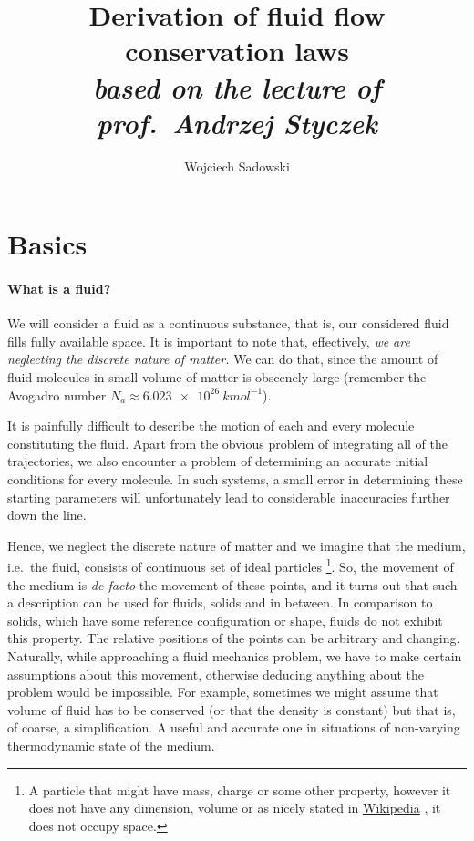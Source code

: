 \documentclass[a4paper]{article}
\title{Derivation of fluid flow conservation laws\\
\large \textit{based on the lecture of prof.\ Andrzej Styczek}}
\author{Wojciech Sadowski}
\newcommand{\wikilink}[2][Wikipedia]{%
  \href{https://en.wikipedia.org/wiki/#2}{#1}%
}
\begin{document}
\maketitle

\section{Basics}

\paragraph{What is a fluid?}
We will consider a fluid as a continuous substance, that is, our considered
fluid fills fully available space. It is important to note that, effectively,
\emph{we are neglecting the discrete nature of matter.} We can do that, since
the amount of fluid molecules in small volume of matter is obscenely large
(remember the Avogadro number \(N_a\approx\SI{6.023e26}{kmol^{-1}}\)).

It is painfully difficult to describe the motion of each and every molecule
constituting the fluid. Apart from the obvious problem of integrating all of
the trajectories, we also encounter a problem of determining an accurate
initial conditions for every molecule. In such systems, a small error in
determining these starting parameters will unfortunately lead to considerable
inaccuracies further down the line.

Hence, we neglect the discrete nature of matter and we imagine that the medium,
i.e.\ the fluid, consists of continuous set of ideal particles%
\footnote{%
	A particle that might have mass, charge or some other property, however it does
	not have any dimension, volume or as nicely stated in
	\wikilink{Point\_particle}, it does not occupy space.
}.
So, the movement of the medium is \emph{de facto} the movement of these points,
and it turns out that such a description can be used for fluids, solids and
 in between. In comparison to solids, which have some 
reference configuration or shape, fluids do not exhibit this property. The
relative positions of the points can be arbitrary and changing. Naturally,
while approaching a fluid mechanics problem, we have to make certain
assumptions about this movement, otherwise deducing anything about the problem
would be impossible. For example, sometimes we might assume that volume of
fluid has to be conserved (or that the density is constant) but that is, of
coarse, a simplification. A useful and accurate one in situations of
non-varying thermodynamic state of the medium.
\end{document}
